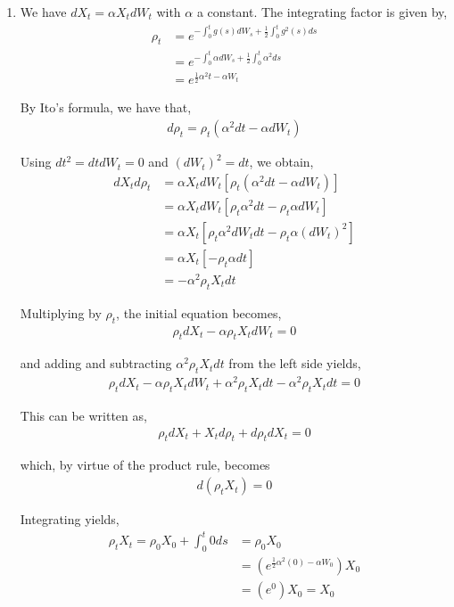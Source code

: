 \documentclass[12pt]{article}
\begin{document}
\begin{enumerate}[\alph*)]

\item We have $dX_t = \alpha X_t dW_t$ with $\alpha$ a constant. The integrating factor is given by,
\begin{align*}
\rho_t &= e^{-\int_0^t g(s) dW_s + \frac{1}{2}\int_0^t g^2(s) ds}\\
&= e^{-\int_0^t \alpha dW_s + \frac{1}{2}\int_0^t \alpha^2 ds}\\
&= e^{\frac{1}{2} \alpha^2t - \alpha W_t}
\end{align*}

By Ito's formula, we have that,
\begin{align*}
d\rho_t = \rho_t(\alpha^2 dt - \alpha dW_t)
\end{align*}

Using $dt^2 = dt dW_t = 0$ and $(dW_t)^2 = dt$, we obtain,
\begin{align*}
dX_td\rho_t &= \alpha X_t dW_t[\rho_t(\alpha^2 dt - \alpha dW_t)]\\
&= \alpha X_t dW_t[\rho_t \alpha^2 dt - \rho_t \alpha dW_t]\\
&= \alpha X_t [\rho_t \alpha^2 dW_t dt - \rho_t \alpha (dW_t)^2]\\
&= \alpha X_t [-\rho_t \alpha dt]\\
&= -\alpha^2 \rho_t X_t dt
\end{align*}

Multiplying by $\rho_t$, the initial equation becomes,
\begin{align*}
\rho_tdX_t - \alpha\rho_tX_tdW_t = 0
\end{align*}

and adding and subtracting $\alpha^2\rho_tX_tdt$ from the left side yields,
\begin{align*}
\rho_tdX_t - \alpha\rho_tX_tdW_t + \alpha^2\rho_tX_tdt - \alpha^2\rho_tX_tdt = 0
\end{align*}

This can be written as,
\begin{align*}
\rho_tdX_t + X_td\rho_t + d\rho_t dX_t = 0
\end{align*}

which, by virtue of the product rule, becomes
\begin{align*}
d(\rho_tX_t) = 0
\end{align*}

Integrating yields,
\begin{align*}
\rho_tX_t = \rho_0X_0 + \int_0^t 0 ds &= \rho_0X_0\\
&= (e^{\frac{1}{2} \alpha^2(0) - \alpha W_0})X_0\\
&= (e^0)X_0 = X_0
\end{align*}


\end{enumerate}
\end{document}
